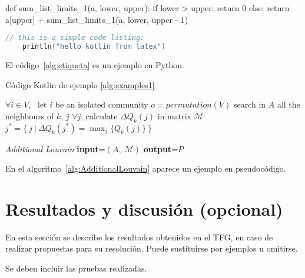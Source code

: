 \documentclass[12pt,twoside,titlepage]{report}
\newcommand\blankpage{%
    \newpage
    \null
    \thispagestyle{empty}%
    \newpage}
\begin{document}
\begin{mypython}[float={!t},caption={Titulo del algoritmo/código.},label={alg:etiqueta}]
	def sum_list_limits_1(a, lower, upper):
	if lower > upper:
	return 0
	else:
	return a[upper] + sum_list_limits_1(a, lower, upper - 1)
\end{mypython}


\begin{lstlisting}[caption={Simple code listing.}, label={alg:examples1}, language=Kotlin]
	// this is a simple code listing:
	println("hello kotlin from latex")
	\end{lstlisting}

El código~\ref{alg:etiqueta} es un ejemplo en Python.

Código Kotlin de ejemplo \ref{alg:examples1}


\begin{algorithm}
	\begin{algorithmic}[1]
		\STATE $\forall i \in V$, \ let $i$ be an isolated community
		\STATE $o=permutation(V)$
		\STATE search in $A$ all the neighbours of $k$, $j$
		\STATE $\forall j$, calculate $\Delta Q_k(j)$ in matrix $\mathcal{M}$
		\STATE $j^*=\{ \ j \ | \ \Delta Q_k(j^*)=\max_j\{Q_k(j)\} \ \}$
		\ELSE
		\ENDIF
		\ENDFOR
	\end{algorithmic}\caption{\textit{Additional Louvain} \textbf{input}=$\left(A, \ \mathcal{M}\right)$ \textbf{output}=$P$}
	\label{alg:AdditionalLouvain}
\end{algorithm}
En el algoritmo~\ref{alg:AdditionalLouvain} aparece un ejemplo en pseudocódigo.











\chapter{Resultados y discusión (opcional)}
\label{sec:resulObtenidos}


En esta sección se describe los resultados obtenidos en el TFG, en caso de realizar propuestas para su resolución. Puede sustituirse por ejemplos u omitirse.

Se deben incluir las pruebas realizadas.

\blankpage
\end{document}
